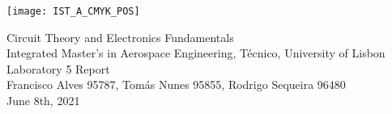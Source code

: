
\thispagestyle {empty}

\texttt{[image: IST\_A\_CMYK\_POS]}

\begin{center}
%
\vspace{1.0cm}

\vspace{1cm}
{\FontLb Circuit Theory and Electronics Fundamentals} \\ %
\vspace{1cm}
{\FontSn Integrated Master's in Aerospace Engineering, Técnico, University of Lisbon} \\ 
\vspace{1cm}
{\FontSn Laboratory 5 Report} \\ 
\vspace{1cm}
{\FontSn Francisco Alves 95787, Tomás Nunes 95855, Rodrigo Sequeira 96480} \\ 
\vspace{1cm}
{\FontSn June 8th, 2021} 
%
\end{center}

